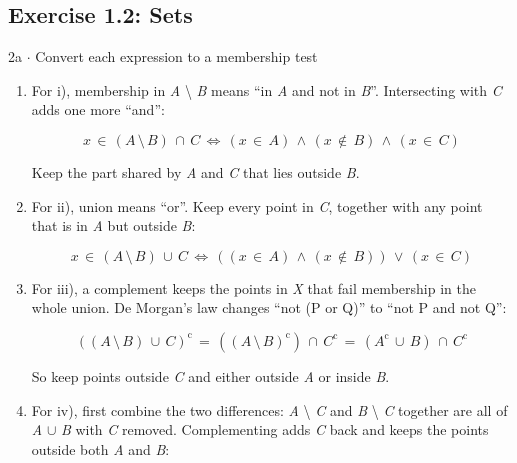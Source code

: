 \documentclass[11pt]{article}
\begin{document}
\begin{keepsection}\subsection{Exercise 1.2: Sets}

\begin{workedbox}{2a \ensuremath{\cdot} Convert each expression to a membership test}
\begin{enumerate}
\item {}
For i), membership in \textit{A} \textbackslash{} \textit{B} means “in \textit{A} and not in \textit{B}”. Intersecting with \textit{C} adds one more “and”:

\begin{equation*}{x}\, \in \, ({A}\, \setminus \, {B})\, \cap \, {C}\, \Leftrightarrow \, ({x}\, \in \, {A})\, \land \, ({x}\, \notin \, {B})\, \land \, ({x}\, \in \, {C})\end{equation*}

Keep the part shared by \textit{A} and \textit{C} that lies outside \textit{B}.
\item {}
For ii), union means “or”. Keep every point in \textit{C}, together with any point that is in \textit{A} but outside \textit{B}:

\begin{equation*}{x}\, \in \, ({A}\, \setminus \, {B})\, \cup \, {C}\, \Leftrightarrow \, (({x}\, \in \, {A})\, \land \, ({x}\, \notin \, {B}))\, \lor \, ({x}\, \in \, {C})\end{equation*}
\item {}
For iii), a complement keeps the points in \textit{X} that fail membership in the whole union. De Morgan’s law changes “not (P or Q)” to “not P and not Q”:

\begin{equation*}(({A}\, \setminus \, {B})\, \cup \, {C})^{\mathrm{c}}\, =\, (({A}\, \setminus \, {B})^{\mathrm{c}})\, \cap \, {C}^{\mathrm{c}}\, =\, ({A}^{\mathrm{c}}\, \cup \, {B})\, \cap \, {C}^{\mathrm{c}}\end{equation*}

So keep points outside \textit{C} and either outside \textit{A} or inside \textit{B}.
\item {}
For iv), first combine the two differences: \textit{A} \textbackslash{} \textit{C} and \textit{B} \textbackslash{} \textit{C} together are all of \textit{A} \ensuremath{\cup} \textit{B} with \textit{C} removed. Complementing adds \textit{C} back and keeps the points outside both \textit{A} and \textit{B}:


\end{enumerate}
\end{workedbox}
\end{keepsection}
\end{document}
